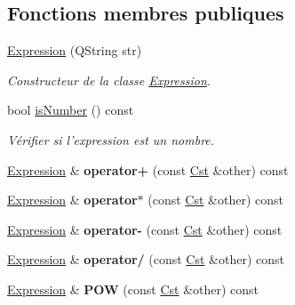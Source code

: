 \subsection*{Fonctions membres publiques}
\begin{DoxyCompactItemize}
\item 
\hyperlink{classcalcul_1_1_expression_a85f5f40095d4be1fb44f703c6c854da0}{Expression} (Q\-String str)
\begin{DoxyCompactList}\small\item\em Constructeur de la classe \hyperlink{classcalcul_1_1_expression}{Expression}. \end{DoxyCompactList}\item 
bool \hyperlink{classcalcul_1_1_expression_a4b892bc1593c0717f90e085f1badd6d9}{is\-Number} () const 
\begin{DoxyCompactList}\small\item\em Vérifier si l'expression est un nombre. \end{DoxyCompactList}\item 
\hypertarget{classcalcul_1_1_expression_af04a22ee7ebb0c9d1b595904ffae62dc}{\hyperlink{classcalcul_1_1_expression}{Expression} \& {\bfseries operator+} (const \hyperlink{classcalcul_1_1_cst}{Cst} \&other) const }\label{classcalcul_1_1_expression_af04a22ee7ebb0c9d1b595904ffae62dc}

\item 
\hypertarget{classcalcul_1_1_expression_a1ec539865decac6220c7b7db3524d031}{\hyperlink{classcalcul_1_1_expression}{Expression} \& {\bfseries operator$\ast$} (const \hyperlink{classcalcul_1_1_cst}{Cst} \&other) const }\label{classcalcul_1_1_expression_a1ec539865decac6220c7b7db3524d031}

\item 
\hypertarget{classcalcul_1_1_expression_af0a2058ed6730e6b8c0e0d296e7d55fb}{\hyperlink{classcalcul_1_1_expression}{Expression} \& {\bfseries operator-\/} (const \hyperlink{classcalcul_1_1_cst}{Cst} \&other) const }\label{classcalcul_1_1_expression_af0a2058ed6730e6b8c0e0d296e7d55fb}

\item 
\hypertarget{classcalcul_1_1_expression_a0d747d1ecc7a36b244c78ff024549586}{\hyperlink{classcalcul_1_1_expression}{Expression} \& {\bfseries operator/} (const \hyperlink{classcalcul_1_1_cst}{Cst} \&other) const }\label{classcalcul_1_1_expression_a0d747d1ecc7a36b244c78ff024549586}

\item 
\hypertarget{classcalcul_1_1_expression_a21d0696df2897bafb91ca2d7161199c3}{\hyperlink{classcalcul_1_1_expression}{Expression} \& {\bfseries P\-O\-W} (const \hyperlink{classcalcul_1_1_cst}{Cst} \&other) const }\label{classcalcul_1_1_expression_a21d0696df2897bafb91ca2d7161199c3}


\end{DoxyCompactItemize}
